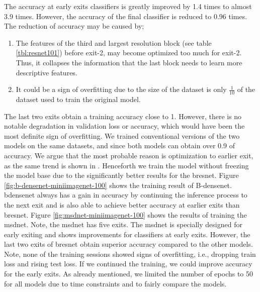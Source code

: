The accuracy at early exits classifiers is greatly improved by 1.4 times to almost 3.9 times. However, the accuracy of the final classifier is reduced to 0.96 times. The reduction of accuracy may be caused by;
\begin{enumerate}
	\item The features of the third and largest resolution block (see table \ref{tbl:resnet101}) before exit-2, may become optimized too much for exit-2. Thus, it collapses the information that the last block needs to learn more descriptive features. 
	\item It could be a sign of overfitting due to the size of the dataset is only $\frac{1}{10}$ of the dataset used to train the original model. 
\end{enumerate}
The last two exits obtain a training accuracy close to 1. However, there is no notable degradation in validation loss or accuracy, which would have been the most definite sign of overfitting. We trained conventional versions of the two models on the same datasets, and since both models can obtain over 0.9 of accuracy. We argue that the most probable reason is optimization to earlier exit, as the same trend is shown in \cite{huang_multi-scale_2017}.
Henceforth we train the model without freezing the model base due to the significantly better results for the \gls{bresnet}. Figure \ref{fig:b-densenet-miniimagenet-100} shows the training result of B-\gls{densenet}. \gls{bdensenet} always has a gain in accuracy by continuing the inference process to the next exit and is also able to achieve better accuracy at earlier exits than \gls{bresnet}. Figure \ref{fig:msdnet-miniimagenet-100} shows the results of training the \gls{msdnet}. Note, the \gls{msdnet} has five exits. The \gls{msdnet} is specially designed for early exiting and shows improvements for classifiers at early exits. However, the last two exits of \gls{bresnet} obtain superior accuracy compared to the other models. 
Note, none of the training sessions showed signs of overfitting, i.e., dropping train loss and rising test loss. If we continued the training, we could improve accuracy for the early exits. As already mentioned, we limited the number of epochs to 50 for all models due to time constraints and to fairly compare the models. 
